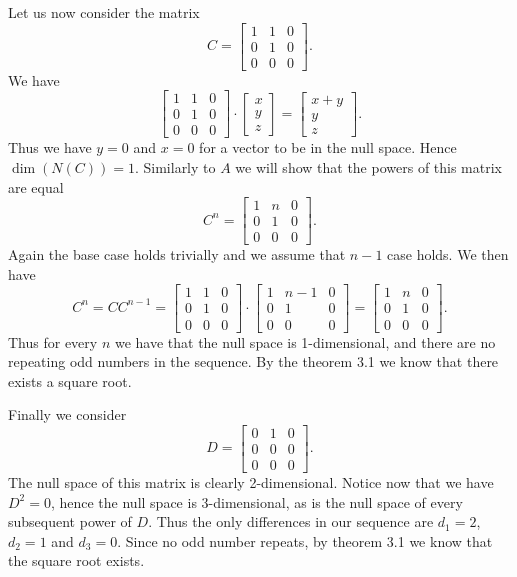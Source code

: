 \documentclass{article}
\begin{document}
\begin{solution}
  Let us now consider the matrix
  \[C = \begin{bmatrix} 1 & 1 & 0\\ 0 & 1 & 0\\ 0 & 0 & 0 \end{bmatrix}.\]
  We have
  \[\begin{bmatrix} 1 & 1 & 0\\ 0 & 1 & 0\\ 0 & 0 & 0 \end{bmatrix} \cdot \begin{bmatrix} x\\ y\\ z \end{bmatrix} = \begin{bmatrix} x + y\\ y\\ z \end{bmatrix}.\]
  Thus we have $y = 0$ and $x = 0$ for a vector to be in the null space.
  Hence $\dim(N(C)) = 1$.
  Similarly to $A$ we will show that the powers of this matrix are equal
  \[C^n = \begin{bmatrix} 1 & n & 0\\ 0 & 1 & 0\\ 0 & 0 & 0 \end{bmatrix}.\]
  Again the base case holds trivially and we assume that $n - 1$ case holds.
  We then have
  \[C^n = CC^{n - 1} = \begin{bmatrix} 1 & 1 & 0\\ 0 & 1 & 0\\ 0 & 0 & 0 \end{bmatrix} \cdot \begin{bmatrix} 1 & n - 1 & 0\\ 0 & 1 & 0\\ 0 & 0 & 0 \end{bmatrix} = \begin{bmatrix} 1 & n & 0\\ 0 & 1 & 0\\ 0 & 0 & 0 \end{bmatrix}.\]
  Thus for every $n$ we have that the null space is 1-dimensional, and there are no repeating odd numbers in the sequence.
  By the theorem 3.1 we know that there exists a square root.

  Finally we consider
  \[D = \begin{bmatrix} 0 & 1 & 0\\ 0 & 0 & 0\\ 0 & 0 & 0 \end{bmatrix}.\]
  The null space of this matrix is clearly 2-dimensional.
  Notice now that we have $D^2 = 0$, hence the null space is 3-dimensional, as is the null space of every subsequent power of $D$.
  Thus the only differences in our sequence are $d_1 = 2$, $d_2 = 1$ and $d_3 = 0$.
  Since no odd number repeats, by theorem 3.1 we know that the square root exists.
\end{solution}
\end{document}
